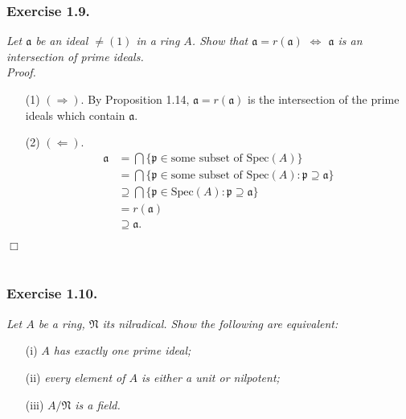 \documentclass{article}
\begin{document}



\subsubsection*{Exercise 1.9.}
\emph{Let $\mathfrak{a}$ be an ideal $\neq (1)$ in a ring $A$.
Show that $\mathfrak{a} = r(\mathfrak{a})$ $\Longleftrightarrow$
$\mathfrak{a}$ is an intersection of prime ideals.} \\



\emph{Proof.}
\begin{enumerate}
\item[(1)]
  $(\Longrightarrow)$.
  By Proposition 1.14,
  $\mathfrak{a} = r(\mathfrak{a})$ is the intersection of the prime ideals which contain
  $\mathfrak{a}$.

\item[(2)]
  $(\Longleftarrow)$.
  \begin{align*}
    \mathfrak{a}
    &= \bigcap \{ \mathfrak{p} \in \text{some subset of } \mathrm{Spec}(A) \} \\
    &= \bigcap \{ \mathfrak{p} \in \text{some subset of } \mathrm{Spec}(A)
      : \mathfrak{p} \supseteq \mathfrak{a} \} \\
    &\supseteq
    \bigcap \{ \mathfrak{p} \in \mathrm{Spec}(A) : \mathfrak{p} \supseteq \mathfrak{a} \} \\
    &= r(\mathfrak{a}) \\
    &\supseteq \mathfrak{a}.
  \end{align*}
\end{enumerate}
$\Box$ \\\\






\subsubsection*{Exercise 1.10.}
\emph{Let $A$ be a ring, $\mathfrak{N}$ its nilradical.
Show the following are equivalent:}
\begin{enumerate}
\item[(i)]
  \emph{$A$ has exactly one prime ideal;}

\item[(ii)]
  \emph{every element of $A$ is either a unit or nilpotent;}

\item[(iii)]
  \emph{$A/\mathfrak{N}$ is a field.} \\
\end{enumerate}
\end{document}
